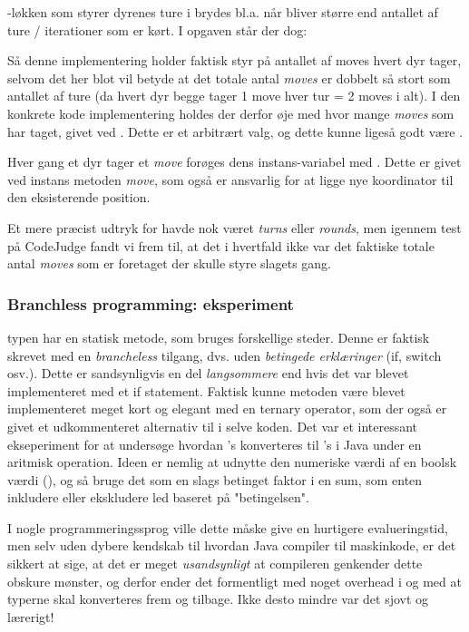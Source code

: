 -løkken som styrer dyrenes ture i  brydes bl.a. når  bliver større end antallet af ture / iterationer som er kørt. I opgaven står der dog:
\begin{displayquote}
\large{}
\end{displayquote}

Så denne implementering holder faktisk styr på antallet af moves hvert dyr tager, selvom det her blot vil betyde at det totale antal \textit{moves} er dobbelt så stort som antallet af ture (da hvert dyr begge tager 1 move hver tur = 2 moves i alt). I den konkrete kode implementering holdes der derfor øje med hvor mange \textit{moves} som  har taget, givet ved . Dette er et arbitrært valg, og dette kunne ligeså godt være .

Hver gang et dyr tager et \textit{move} forøges dens instans-variabel  med . Dette er givet ved instans metoden \textit{move}, som også er ansvarlig for at ligge nye koordinator til den eksisterende position.

Et mere præcist udtryk for  havde nok været \textit{turns} eller \textit{rounds}, men igennem test på CodeJudge fandt vi frem til, at det i hvertfald ikke var det faktiske totale antal \textit{moves} som er foretaget der skulle styre slagets gang. \\[1pt]

\subsubsection*{\quad\quad Branchless programming: eksperiment}

 typen har en statisk  metode, som bruges forskellige steder. Denne er faktisk skrevet med en \textit{brancheless} tilgang, dvs. uden \textit{betingede erklæringer} (if, switch osv.). Dette er sandsynligvis en del \textit{langsommere} end hvis det var blevet implementeret med et if statement. Faktisk kunne metoden være blevet implementeret meget kort og elegant med en ternary operator, som der også er givet et udkommenteret alternativ til i selve koden. Det var et interessant ekseperiment for at undersøge hvordan 's konverteres til 's i Java under en aritmisk operation. Ideen er nemlig at udnytte den numeriske værdi af en boolsk værdi (), og så bruge det som en slags betinget faktor i en sum, som enten inkludere eller ekskludere led baseret på "betingelsen".

I nogle programmeringssprog ville dette måske give en hurtigere evalueringstid, men selv uden dybere kendskab til hvordan Java compiler til maskinkode, er det sikkert at sige, at det er meget \textit{usandsynligt} at compileren genkender dette obskure mønster, og derfor ender det formentligt med noget overhead i og med at typerne skal konverteres frem og tilbage. Ikke desto mindre var det sjovt og lærerigt!

